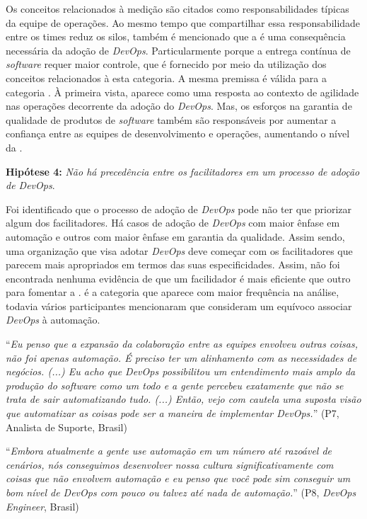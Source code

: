 Os conceitos relacionados à medição são citados como responsabilidades típicas
da equipe de operações. Ao mesmo tempo que compartilhar essa responsabilidade
entre os times reduz os silos, também é mencionado que a 
é uma consequência necessária da adoção de {\it DevOps}. Particularmente porque a
entrega contínua de {\it software} requer maior controle, que é fornecido por
meio da utilização dos conceitos relacionados à esta categoria.
A mesma premissa é válida para a categoria .
À primeira vista,  aparece como uma resposta ao
contexto de agilidade nas operações decorrente da adoção do {\it DevOps}. Mas,
os esforços na garantia de qualidade de produtos de {\it software} também são
responsáveis por aumentar a confiança entre as equipes de desenvolvimento e
operações, aumentando o nível da \cc.

\begin{mh}
\textbf{Hipótese 4:} {\it Não há precedência entre os facilitadores em um
processo de adoção de DevOps}.
\end{mh}

Foi identificado que o processo de adoção de {\it DevOps} pode não ter que
priorizar algum dos facilitadores. Há casos de adoção de {\it DevOps} com maior
ênfase em automação e outros com maior ênfase em garantia da qualidade. Assim
sendo, uma organização que visa adotar {\it DevOps} deve começar com os
facilitadores que parecem mais apropriados em termos das suas especificidades.
Assim, não foi encontrada nenhuma evidência de que um facilidador é mais
eficiente que outro para fomentar a \cc.  é a categoria que
aparece com maior frequência na análise, todavia vários participantes mencionaram
que consideram um equívoco associar {\it DevOps} à automação.

\begin{mq}
``\emph{Eu penso que a expansão da colaboração entre as equipes envolveu outras
coisas, não foi apenas automação. É preciso ter um alinhamento com as
necessidades de negócios. (...) Eu acho que DevOps possibilitou um entendimento
mais amplo da produção do software como um todo e a gente percebeu exatamente
que não se trata de sair automatizando tudo. (...) Então, vejo com cautela uma
suposta visão que automatizar as coisas pode ser a maneira de implementar DevOps.}''
(P7, Analista de Suporte, Brasil)
\end{mq}

\begin{mq}
``\emph{Embora atualmente a gente use automação em um número até razoável de
cenários, nós conseguimos desenvolver nossa cultura significativamente com
coisas que não envolvem automação e eu penso que você pode sim conseguir um bom
nível de DevOps com pouco ou talvez até nada de automação.}'' (P8, {\it DevOps
Engineer}, Brasil)
\end{mq}

